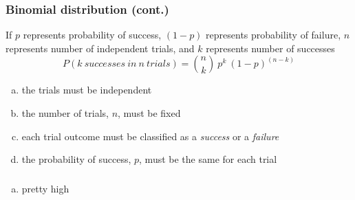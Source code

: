 
\begin{frame}
\frametitle{Binomial distribution (cont.)}

{
If $p$ represents probability of success, $(1-p)$ represents probability of failure, $n$ represents number of independent trials, and $k$ represents number of successes 
\[P(k~successes~in~n~trials) = {n \choose k}~p^k~(1-p)^{(n-k)} \]
} 


\end{frame}


\begin{frame}


\begin{enumerate}[(a)]
\item the trials must be independent
\item the number of trials, $n$, must be fixed
\item each trial outcome must be classified as a \textit{success} or a \textit{failure}
\item the probability of success, $p$, must be the same for each trial
\end{enumerate}

\end{frame}


\begin{frame}
\frametitle{}


\begin{enumerate}[(a)]
\item pretty high
\end{enumerate}

\vfill


\end{frame}

